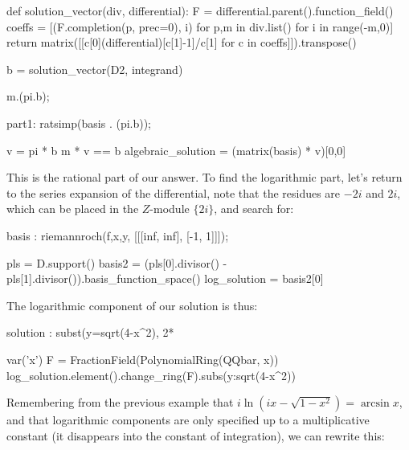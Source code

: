 \begin{sageblock}[ex8.7]
def solution_vector(div, differential):
    F = differential.parent().function_field()
    coeffs = [(F.completion(p, prec=0), i) for p,m in div.list() for i in range(-m,0)]
    return matrix([[c[0](differential)[c[1]-1]/c[1] for c in coeffs]]).transpose()
\end{sageblock}

\begin{sageblock}[ex8.7]
b = solution_vector(D2, integrand)
\end{sageblock}

\begin{maximablock}
m.(pi.b);
\end{maximablock}

\begin{maximablock}
part1: ratsimp(basis . (pi.b));
\end{maximablock}

\begin{sageblock}[ex8.7]
v = pi * b
m * v == b
algebraic_solution = (matrix(basis) * v)[0,0]
\end{sageblock}

This is the rational part of our answer.  To find the logarithmic
part, let's return to the series expansion of the differential,
note that the residues are $-2i$ and $2i$, which can be placed
in the $Z$-module $\{2i\}$, and search for:

\begin{maximablock}
basis : riemannroch(f,x,y,
         [[[inf, inf], [-1, 1]]]);
\end{maximablock}

\begin{sageblock}[ex8.7]
pls = D.support()
basis2 = (pls[0].divisor() - pls[1].divisor()).basis_function_space()
log_solution = basis2[0]
\end{sageblock}

The logarithmic component of our solution is thus:

\begin{maximablock}
solution : subst(y=sqrt(4-x^2),
             2*%
\end{maximablock}

\begin{sageblock}[ex8.7]
var('x')
F = FractionField(PolynomialRing(QQbar, x))
log_solution.element().change_ring(F).subs({y:sqrt(4-x^2)})
\end{sageblock}

Remembering from the previous example that $i \ln(ix-\sqrt{1-x^2}) = \arcsin x$,
and that logarithmic components are only specified up
to a multiplicative constant (it disappears into the constant
of integration), we can rewrite this:

